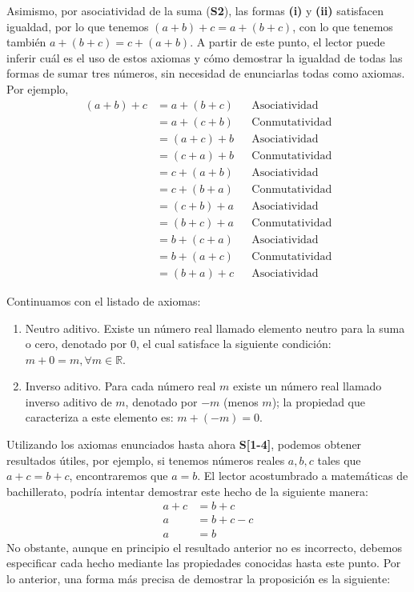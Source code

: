 \documentclass[11pt]{article}
\newcommand{\R}{\mathbb{R}}
\begin{document}
Asimismo, por asociatividad de la suma (\textbf{S2}), las formas \textbf{(i)} y \textbf{(ii)} satisfacen igualdad, por lo que tenemos $(a+b)+c=a+(b+c)$, con lo que tenemos también $a+(b+c)=c+(a+b)$. A partir de este punto, el lector puede inferir cuál es el uso de estos axiomas y cómo demostrar la igualdad de todas las formas de sumar tres números, sin necesidad de enunciarlas todas como axiomas. Por ejemplo, \begin{align*}
    (a+b)+c &= a+(b+c) && \text{Asociatividad}\\
    &= a+(c+b) && \text{Conmutatividad}\\
    &= (a+c)+b && \text{Asociatividad}\\
    &= (c+a)+b && \text{Conmutatividad}\\
    &= c+(a+b) && \text{Asociatividad}\\
    &= c+(b+a) && \text{Conmutatividad}\\
    &= (c+b)+a && \text{Asociatividad}\\
    &= (b+c)+a && \text{Conmutatividad}\\
    &= b+(c+a) && \text{Asociatividad}\\
    &= b+(a+c) && \text{Conmutatividad}\\
    &= (b+a)+c && \text{Asociatividad}
\end{align*}

Continuamos con el listado de axiomas:

\begin{enumerate}[start=3,label=S\arabic*.]
    \item Neutro aditivo. Existe un número real llamado elemento neutro para la suma o cero, denotado por $0$, el cual satisface la siguiente condición: $ m+0=m,\forall m \in \R $.
    \item Inverso aditivo. Para cada número real $m$ existe un número real llamado inverso aditivo de $m$, denotado por $-m$ (menos $m$); la propiedad que caracteriza a este elemento es: $ m + (-m) = 0 $.
\end{enumerate}

Utilizando los axiomas enunciados hasta ahora \textbf{S[1-4]}, podemos obtener resultados útiles, por ejemplo, si tenemos números reales $a,b,c$ tales que $a+c=b+c$, encontraremos que $a=b$. El lector acostumbrado a matemáticas de bachillerato, podría intentar demostrar este hecho de la siguiente manera: \begin{align*}
    a+c &= b+c\\
    a &= b+c-c\\
    a &= b
\end{align*}
No obstante, aunque en principio el resultado anterior no es incorrecto, debemos especificar cada hecho mediante las propiedades conocidas hasta este punto. Por lo anterior, una forma más precisa de demostrar la proposición es la siguiente:
\end{document}
